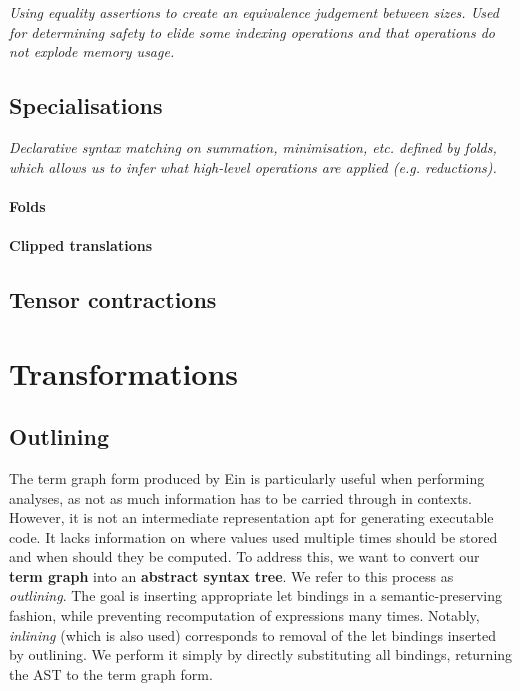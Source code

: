 \textit{Using equality assertions to create an equivalence judgement between sizes. Used for determining safety to elide some indexing operations and that operations do not explode memory usage.}
\todothis

\subsection{Specialisations}

\textit{Declarative syntax matching on summation, minimisation, etc. defined by folds, which allows us to infer what high-level operations are applied (e.g. reductions).} \todothis

\paragraph{Folds}

\paragraph{Clipped translations}

\subsection{Tensor contractions} 

\section{Transformations}

\subsection{Outlining}

The term graph form produced by Ein is particularly useful when performing analyses, as not as much information has to be carried through in contexts. However, it is not an intermediate representation apt for generating executable code. It lacks information on where values used multiple times should be stored and when should they be computed. To address this, we want to convert our \textbf{term graph} into an \textbf{abstract syntax tree}. We refer to this process as \textit{outlining}. The goal is inserting appropriate let bindings in a semantic-preserving fashion, while preventing recomputation of expressions many times. Notably, \textit{inlining} (which is also used) corresponds to removal of the let bindings inserted by outlining. We perform it simply by directly substituting all bindings, returning the AST to the term graph form.

